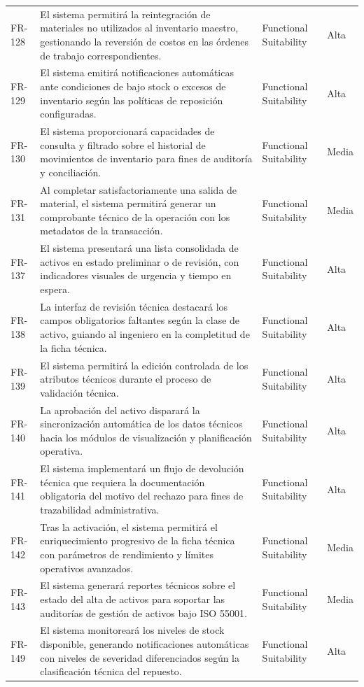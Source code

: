 \begin{longtable}{>{\raggedright\arraybackslash}p{} >{\raggedright\arraybackslash}p{} >{\raggedright\arraybackslash}p{} >{\raggedright\arraybackslash}p{}}
FR-128 & El sistema permitirá la reintegración de materiales no utilizados al inventario maestro, gestionando la reversión de costos en las órdenes de trabajo correspondientes. & Functional Suitability & Alta \\
FR-129 & El sistema emitirá notificaciones automáticas ante condiciones de bajo stock o excesos de inventario según las políticas de reposición configuradas. & Functional Suitability & Alta \\
FR-130 & El sistema proporcionará capacidades de consulta y filtrado sobre el historial de movimientos de inventario para fines de auditoría y conciliación. & Functional Suitability & Media \\
FR-131 & Al completar satisfactoriamente una salida de material, el sistema permitirá generar un comprobante técnico de la operación con los metadatos de la transacción. & Functional Suitability & Media \\
FR-137 & El sistema presentará una lista consolidada de activos en estado preliminar o de revisión, con indicadores visuales de urgencia y tiempo en espera. & Functional Suitability & Alta \\
FR-138 & La interfaz de revisión técnica destacará los campos obligatorios faltantes según la clase de activo, guiando al ingeniero en la completitud de la ficha técnica. & Functional Suitability & Alta \\
FR-139 & El sistema permitirá la edición controlada de los atributos técnicos durante el proceso de validación técnica. & Functional Suitability & Alta \\
FR-140 & La aprobación del activo disparará la sincronización automática de los datos técnicos hacia los módulos de visualización y planificación operativa. & Functional Suitability & Alta \\
FR-141 & El sistema implementará un flujo de devolución técnica que requiera la documentación obligatoria del motivo del rechazo para fines de trazabilidad administrativa. & Functional Suitability & Alta \\
FR-142 & Tras la activación, el sistema permitirá el enriquecimiento progresivo de la ficha técnica con parámetros de rendimiento y límites operativos avanzados. & Functional Suitability & Media \\
FR-143 & El sistema generará reportes técnicos sobre el estado del alta de activos para soportar las auditorías de gestión de activos bajo ISO 55001. & Functional Suitability & Media \\
FR-149 & El sistema monitoreará los niveles de stock disponible, generando notificaciones automáticas con niveles de severidad diferenciados según la clasificación técnica del repuesto. & Functional Suitability & Alta \\

\end{longtable}
